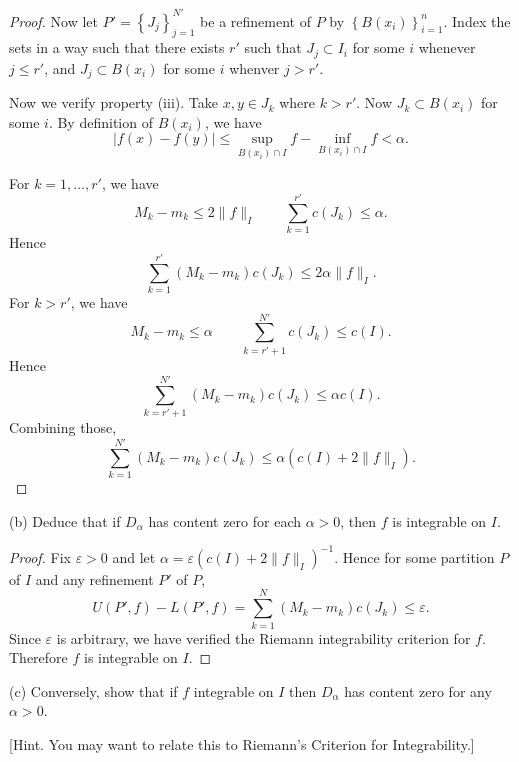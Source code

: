 \begin{proof}
	Now let  $P' = \left\{ J_j \right\}_{j = 1}^{N'} $ be a refinement of $P$  by $\left\{B(x_i)\right\}_{i = 1}^n$. Index the sets in a way such that there exists $r'$ such that $J_j \subset I_i$ for some $i $ whenever $j \le r'$, and $J_j \subset B(x_i)$  for some $i$ whenver $j > r'$. 

	Now we verify property (iii). Take $x, y \in J_k$ where $k > r'$. Now $J_k \subset B(x_i)$ for some $i$. By definition of $B(x_i)$, we have
	\[
		\left| f(x) - f(y) \right| \le 
		\sup_{B(x_i) \cap I} f - \inf _{B(x_i) \cap I}f < \alpha
	.\] 

	For $k = 1, \ldots, r'$, we have
	\[
		M_k - m_k \le 2 \|f\|_{I} \qquad \sum_{k=1}^{r'} c(J_k) \le \alpha
	.\] 
	Hence
	\[
		\sum_{k=1}^{r'} (M_k- m_k)c(J_k) \le 2 \alpha \|f\|_{I}
	.\] 
	For $k > r'$, we have
	\[
		M_k - m_k \le  \alpha \qquad \sum_{k=r'+1}^{N'} c(J_k) \le c\left( I \right) 
	.\] 
	Hence
	\[
		\sum_{k=r'+1}^{N'} (M_k - m_k) c(J_k) \le \alpha c(I)
	.\] 
	Combining those,
\[
		\sum_{k=1}^{N'} (M_k - m_k) c(J_k) \le \alpha \left(c(I) + 2\|f\|_{I}\right)
	.\]
\end{proof}


\newpage
(b) Deduce that if $D_\alpha$ has content zero for each $\alpha>0$, then $f$ is integrable on $I$.
\begin{proof}
	Fix $\varepsilon>0$ and let $\alpha = \varepsilon \left(c(I)+2\|f\|_I\right)^{-1}$. Hence for some partition $P$ of $I$ and any refinement $P'$ of $P$,
	\[
		U(P', f) - L(P', f) = \sum_{k=1}^N\left(M_k-m_k\right) c\left(J_k\right) \le \varepsilon
	.\] 
	Since $\varepsilon$ is arbitrary, we have verified the Riemann integrability criterion for $f$. Therefore $f$ is integrable on $I$.

\end{proof}

\newpage
(c) Conversely, show that if $f$ integrable on $I$ then $D_\alpha$ has content zero for any $\alpha>0$.

[Hint. You may want to relate this to Riemann's Criterion for Integrability.]

